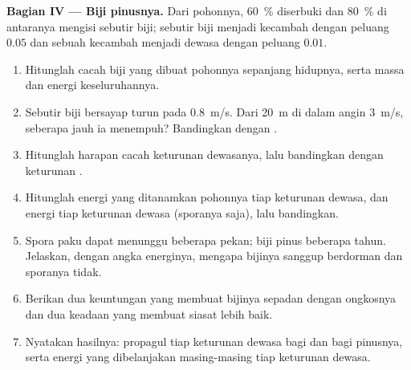\begin{problem}
\medskip
\noindent\textbf{Bagian IV --- Biji pinusnya.}
Dari  pohonnya, \qty{60}{\%} diserbuki dan \qty{80}{\%} di
antaranya mengisi sebutir biji; sebutir biji menjadi kecambah dengan
peluang $0.05$ dan sebuah kecambah menjadi dewasa dengan peluang $0.01$.
\begin{enumerate}[resume]
  \item Hitunglah cacah biji yang dibuat pohonnya sepanjang hidupnya,
        serta massa dan energi keseluruhannya.
  \item Sebutir biji bersayap turun pada \qty{0.8}{m/s}. Dari
        \qty{20}{m} di dalam angin \qty{3}{m/s}, seberapa jauh ia
        menempuh? Bandingkan dengan .
  \item Hitunglah harapan cacah keturunan dewasanya, lalu bandingkan
        dengan keturunan .
  \item Hitunglah energi yang ditanamkan pohonnya tiap keturunan
        dewasa, dan energi  tiap keturunan dewasa
        (sporanya saja), lalu bandingkan.
  \item Spora paku dapat menunggu beberapa pekan; biji pinus beberapa
        tahun. Jelaskan, dengan angka energinya, mengapa bijinya
        sanggup berdorman dan sporanya tidak.
  \item Berikan dua keuntungan yang membuat bijinya sepadan dengan
        ongkosnya dan dua keadaan yang membuat siasat 
        lebih baik.
  \item Nyatakan hasilnya: propagul tiap keturunan dewasa bagi
         dan bagi pinusnya, serta energi yang dibelanjakan
        masing-masing tiap keturunan dewasa.
\end{enumerate}
\end{problem}
